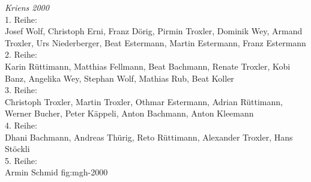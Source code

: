 {\emph{Kriens 2000}\\
    1. Reihe:\\
    Josef Wolf, Christoph Erni, Franz Dörig, Pirmin Troxler, Dominik Wey, Armand
    Troxler, Urs Niederberger, Beat Estermann, Martin Estermann, Franz
    Estermann\\
    2. Reihe:\\
    Karin Rüttimann, Matthias Fellmann, Beat Bachmann, Renate Troxler, Kobi
    Banz, Angelika Wey, Stephan Wolf, Mathias Rub, Beat Koller\\
    3. Reihe:\\
    Christoph Troxler, Martin Troxler, Othmar Estermann, Adrian Rüttimann,
    Werner Bucher, Peter Käppeli, Anton Bachmann, Anton Kleemann\\
    4. Reihe:\\
    Dhani Bachmann, Andreas Thürig, Reto Rüttimann, Alexander Troxler, Hans
    Stöckli\\
    5. Reihe:\\
    Armin Schmid } {fig:mgh-2000}

